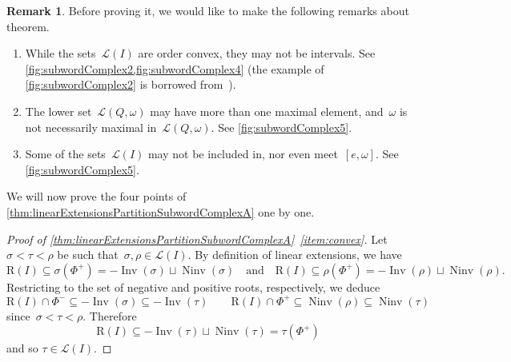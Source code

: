 \documentclass[reqno]{amsart}
\theoremstyle{definition}
\newtheorem{remark}[theorem]{Remark}
\DeclareMathOperator{\Inv}{Inv} %
\DeclareMathOperator{\Ninv}{Ninv} %
\newcommand{\linearExtensions}{\mathcal{L}} %
\newcommand{\Roots}{\mathrm{R}} %
\begin{document}
\begin{remark}
\label{rem:linearExtensionsPartitionSubwordComplexA}
Before proving it, we would like to make the following remarks about theorem.
\begin{enumerate}
\item While the sets~$\linearExtensions(I)$ are order convex, they may not be intervals. See \cref{fig:subwordComplex2,fig:subwordComplex4} (the example of \cref{fig:subwordComplex2} is borrowed from~\cite[Figure~9]{PilaudStump-brickPolytope}).
\item The lower set~$\linearExtensions(Q,\omega)$ may have more than one maximal element, and~$\omega$ is not necessarily maximal in~$\linearExtensions(Q,\omega)$. See \cref{fig:subwordComplex5}.
\item Some of the sets~$\linearExtensions(I)$ may not be included in, nor even meet~$[e,\omega]$. See \cref{fig:subwordComplex5}.
\end{enumerate}
\end{remark}

We will now prove the four points of \cref{thm:linearExtensionsPartitionSubwordComplexA} one by one.

\begin{proof}[Proof of \cref{thm:linearExtensionsPartitionSubwordComplexA}~\eqref{item:convex}]
Let $\sigma < \tau < \rho$ be such that~$\sigma, \rho \in \linearExtensions(I)$.
By definition of linear extensions, we have
\[
\Roots(I) \subseteq \sigma(\Phi^+)=-\Inv(\sigma) \sqcup \Ninv(\sigma)
\quad\text{and}\quad
\Roots(I) \subseteq \rho(\Phi^+)=-\Inv(\rho) \sqcup \Ninv(\rho).
\]
Restricting to the set of negative and positive roots, respectively, we deduce
\[
\Roots(I) \cap \Phi^- \subseteq -\Inv(\sigma) \subseteq -\Inv(\tau) \qquad 
\Roots(I) \cap \Phi^+ \subseteq \Ninv(\rho)  \subseteq \Ninv(\tau)
\]
since~$\sigma < \tau < \rho$. Therefore
\[
\Roots(I) \subseteq -\Inv(\tau) \sqcup \Ninv(\tau) = \tau(\Phi^+)
\]
and so $\tau \in \linearExtensions(I)$.
\end{proof}
\end{document}

